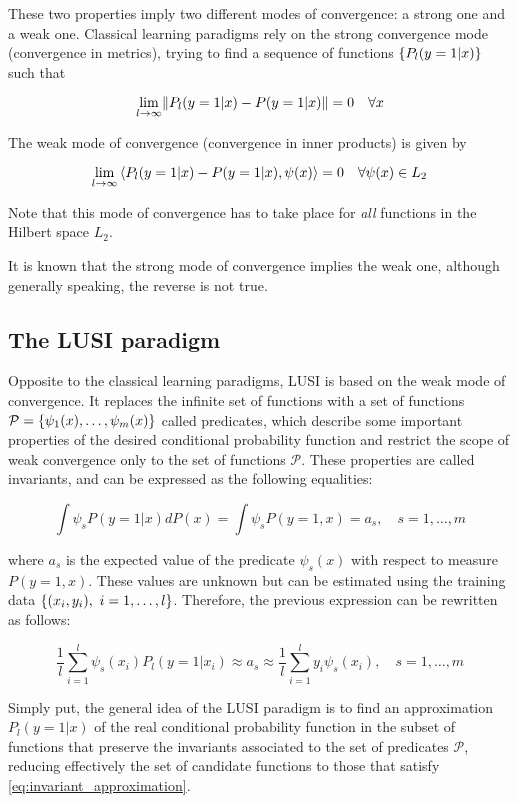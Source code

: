These two properties imply two different modes of convergence: a strong one and a weak one. Classical
learning paradigms rely on the strong convergence mode (convergence in metrics), trying to find a
sequence of functions $\lbrace P_l(y=1 | x) \rbrace$ such that

\[
    \lim_{l \to \infty} \lVert P_l(y=1 | x) - P(y=1 | x) \rVert = 0\quad \forall x
\]

The weak mode of convergence (convergence in inner products) is given by

\[
    \lim_{l \to \infty} \left< P_l(y=1 | x) - P(y=1 | x), \psi(x) \right> = 0\quad \forall \psi(x) \in L_2
\]

Note that this mode of convergence has to take place for \emph{all} functions in the Hilbert space $L_2$.

It is known that the strong mode of convergence implies the weak one, although generally speaking, the
reverse is not true.

\subsection{The LUSI paradigm}

Opposite to the classical learning paradigms, LUSI is based on the weak mode of convergence. It replaces
the infinite set of functions with a set of functions $\mathcal{P} = \lbrace \psi_1(x), \dots, \psi_m(x) \rbrace$
called predicates, which describe some important properties of the desired conditional probability function and
restrict the scope of weak convergence only to the set of functions $\mathcal{P}$. These properties are
called invariants, and can be expressed as the following equalities:

\[
    \int \psi_s P(y=1 | x)dP(x) = \int \psi_s P(y=1, x) = a_s,\quad s = 1, \dots, m
\]

where $a_s$ is the expected value of the predicate $\psi_s(x)$ with respect to measure
$P(y=1, x)$. These values are unknown but can be estimated using the training data
$\lbrace (x_i, y_i),\ i = 1, \dots, l \rbrace$. Therefore, the previous expression can be rewritten
as follows:

\begin{equation}
    \label{eq:invariant_approximation}
    \frac{1}{l} \sum_{i=1}^l \psi_s(x_i)P_l(y=1 | x_i) \approx a_s \approx \frac{1}{l} \sum_{i=1}^l y_i \psi_s(x_i),\quad
    s = 1, \dots, m
\end{equation}

Simply put, the general idea of the LUSI paradigm is to find an approximation $P_l(y=1|x)$ of the
real conditional probability function in the subset of functions that preserve the invariants
associated to the set of predicates $\mathcal{P}$, reducing effectively the set of candidate functions
to those that satisfy \eqref{eq:invariant_approximation}.

